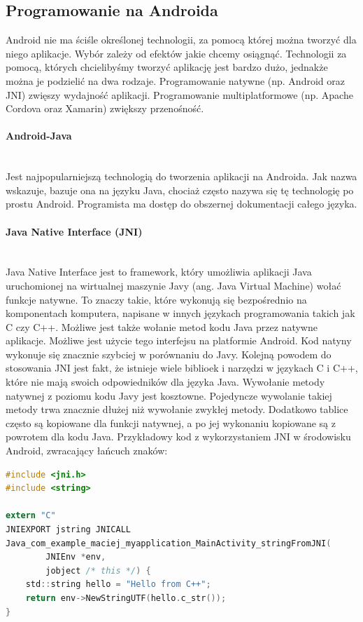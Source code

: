 \subsection{Programowanie na Androida}
Android nie ma ściśle określonej technologii, za pomocą której można tworzyć dla niego aplikacje. Wybór zależy od efektów jakie chcemy osiągnąć. Technologii za pomocą, których chcielibyśmy tworzyć aplikację jest bardzo dużo, jednakże można je podzielić na dwa rodzaje. Programowanie natywne (np. Android oraz JNI) zwięszy wydajność aplikacji. Programowanie multiplatformowe (np. Apache Cordova oraz Xamarin) zwiększy przenośność. 
\paragraph{Android-Java}\mbox{}\\
Jest najpopularniejszą technologią do tworzenia aplikacji na Androida. Jak nazwa wskazuje, bazuje ona na języku Java, chociaż często nazywa się tę technologię po prostu Android. Programista ma dostęp do obszernej dokumentacji całego języka.
\paragraph{Java Native Interface (JNI)}\mbox{}\\
Java Native Interface jest to framework, który umożliwia aplikacji Java uruchomionej na wirtualnej maszynie Javy (ang. Java Virtual Machine) wołać funkcje natywne. To znaczy takie, które wykonują się bezpośrednio na komponentach komputera, napisane w innych językach programowania takich jak C czy C++. Możliwe jest także wołanie metod kodu Java przez natywne aplikacje. Możliwe jest użycie tego interfejsu na platformie Android. Kod natyny wykonuje się znacznie szybciej w porównaniu do Javy. Kolejną powodem do stosowania JNI jest fakt, że istnieje wiele biblioek i narzędzi w językach C i C++, które nie mają swoich odpowiedników dla języka Java. Wywołanie metody natywnej z poziomu kodu Javy jest kosztowne. Pojedyncze wywolanie takiej metody trwa znacznie dłużej niż wywołanie zwykłej metody. Dodatkowo tablice często są kopiowane dla funkcji natywnej, a po jej wykonaniu kopiowane są z powrotem dla kodu Java. Przykładowy kod z wykorzystaniem JNI w środowisku Android, zwracający łańcuch znaków: 
\begin{lstlisting}[language=C]
#include <jni.h>
#include <string>

extern "C"
JNIEXPORT jstring JNICALL
Java_com_example_maciej_myapplication_MainActivity_stringFromJNI(
        JNIEnv *env,
        jobject /* this */) {
    std::string hello = "Hello from C++";
    return env->NewStringUTF(hello.c_str());
}
\end{lstlisting}

